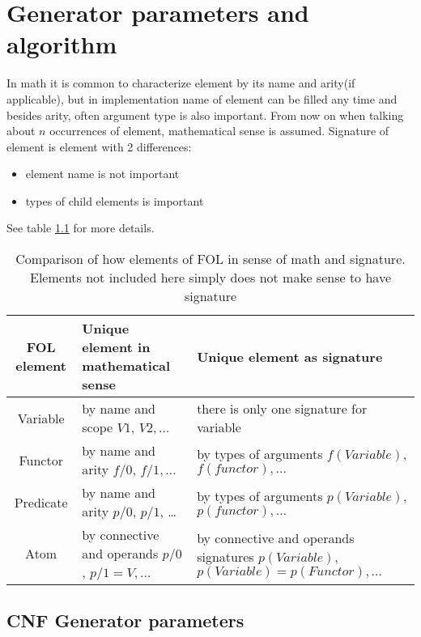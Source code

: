 \chapter{Generator parameters and algorithm}

In math it is common to characterize element by its name and arity(if applicable), but in implementation name of element can be filled any time and besides arity, often argument type is also important. From now on when talking about $n$ occurrences of element, mathematical sense is assumed. Signature of element is element with 2 differences:

\begin{itemize}
  \item element name is not important
  \item types of child elements is important 
\end{itemize}

See table \ref{tab:signatureComparison} for more details.

\begin{table}
  \centering
  \footnotesize
  \begin{tabularx}{\textwidth}{|c|X|X|}
    \hline
    FOL element & Unique element in mathematical sense & Unique element as signature \\
    \hline
    Variable & by name and scope $V1$, $V2, \dots$ & there is only one signature for variable \\  
    \hline
    Functor & by name and arity $f/0$, $f/1, \dots$ & by types of arguments $f(Variable)$, $f(functor), \dots$ \\
    \hline
    Predicate & by name and arity $p/0$, $p/1$, \dots & by types of arguments $p(Variable)$, $p(functor), \dots$ \\
    \hline
    Atom & by connective and operands $p/0$, $p/1 = V, \dots$ & by connective and operands signatures $p(Variable)$, $p(Variable) = p(Functor), \dots$ \\
    \hline
  \end{tabularx}
  \caption{Comparison of how elements of FOL in sense of math and signature. Elements not included here simply does not make sense to have signature}
  \label{tab:signatureComparison}
\end{table}

\section{CNF Generator parameters}

